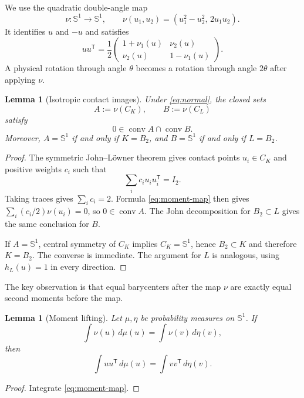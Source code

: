 \documentclass[11pt]{amsart}
\newtheorem{lemma}[theorem]{Lemma}
\theoremstyle{definition}
\theoremstyle{remark}
\newcommand{\Sph}{\mathbb S^1}
\newcommand{\B}{B_2}
\newcommand{\conv}{\operatorname{conv}}
\begin{document}
We use the quadratic double-angle map
\begin{equation}\label{eq:nu}
 \nu:\Sph\longrightarrow\Sph,
 \qquad
 \nu(u_1,u_2)=(u_1^2-u_2^2,\,2u_1u_2).
\end{equation}
It identifies $u$ and $-u$ and satisfies
\begin{equation}\label{eq:moment-map}
 uu^{\mathsf T}
 =\frac12
 \begin{pmatrix}
  1+\nu_1(u)&\nu_2(u)\\
  \nu_2(u)&1-\nu_1(u)
 \end{pmatrix}.
\end{equation}
A physical rotation through angle $\theta$ becomes a rotation through angle
$2\theta$ after applying $\nu$.

\begin{lemma}[Isotropic contact images]\label{lem:isotropic}
Under \eqref{eq:normal}, the closed sets
\[
 A:=\nu(C_K),\qquad B:=\nu(C_L)
\]
satisfy
\[
 0\in\conv A\cap\conv B.
\]
Moreover, $A=\Sph$ if and only if $K=\B$, and $B=\Sph$ if and only if
$L=\B$.
\end{lemma}

\begin{proof}
The symmetric John--L\"owner theorem gives contact points $u_i\in C_K$ and
positive weights $c_i$ such that \cite{John}
\[
 \sum_i c_i u_i u_i^{\mathsf T}=I_2.
\]
Taking traces gives $\sum_i c_i=2$.  Formula \eqref{eq:moment-map} then gives
$\sum_i(c_i/2)\nu(u_i)=0$, so $0\in\conv A$.  The John decomposition for
$\B\subset L$ gives the same conclusion for $B$.

If $A=\Sph$, central symmetry of $C_K$ implies $C_K=\Sph$, hence
$\B\subset K$ and therefore $K=\B$.  The converse is immediate.  The argument
for $L$ is analogous, using $h_L(u)=1$ in every direction.
\end{proof}

The key observation is that equal barycenters after the map $\nu$ are exactly
equal second moments before the map.

\begin{lemma}[Moment lifting]\label{lem:momentlift}
Let $\mu,\eta$ be probability measures on $\Sph$.  If
\[
 \int\nu(u)\,d\mu(u)=\int\nu(v)\,d\eta(v),
\]
then
\[
 \int uu^{\mathsf T}\,d\mu(u)
 =\int vv^{\mathsf T}\,d\eta(v).
\]
\end{lemma}

\begin{proof}
Integrate \eqref{eq:moment-map}.
\end{proof}
\end{document}

